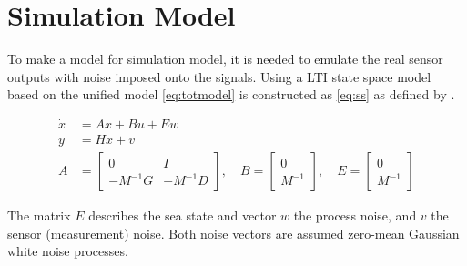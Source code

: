 \chapter{Simulation Model}
\label{ch:simulation-model}

To make a model for simulation model, it is needed to emulate the real
sensor outputs with noise imposed onto the signals. Using a \ac{LTI}
state space model based on the unified model \vref{eq:totmodel} is
constructed as \vref{eq:ss} as defined by \citep[p. 175]{fossen}.

\begin{subequations}
\begin{align}
	\dot x &=  A x + B u + E w \\
	y &= H x + v \\
	A &=
	\begin{bmatrix}
		0 & I\\ -M^{-1}G & -M^{-1}D
	\end{bmatrix}, \quad
	B = 
	\begin{bmatrix}
		0 \\ M^{-1}
	\end{bmatrix}, \quad
	E =
	\begin{bmatrix}
		0 \\ M^{-1}
	\end{bmatrix}
\end{align}
\label{eq:ss}
\end{subequations}

The matrix $E$ describes the sea state and vector $w$ the process noise, and $v$ the sensor (measurement) noise. Both noise
vectors are assumed zero-mean Gaussian white noise processes.



